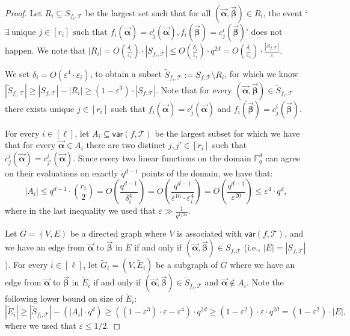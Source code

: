 \documentclass[10pt,a4paper]{article}
\newcommand{\F}{\mathbb{F}}
\renewcommand{\ge}{ \geqslant}
\renewcommand{\le}{ \leqslant}
\renewcommand{\epsilon}{\varepsilon}
\newcommand{\alphab}{\vec{\bm{\alpha}}}
\newcommand{\betab}{\vec{\bm{\beta}}}
\newcommand{\var}{\mathsf{var}}
\renewcommand{\tilde}{\widetilde}
\begin{document}
\begin{proof}
	Let $R_i\subseteq S_{f_i,\mathcal{T}}$ be the largest set such that for all $(\alphab, \betab)\in R_i$, the event `$\exists\ \text{unique } j\in[r_i] \text{ such that }f_i(\alphab)=c_j^i(\alphab),
	f_i(\betab)=c_j^i(\betab)$' does not happen. We note that $|R_i|=O\left(\frac{\delta_i}{\epsilon_i}\right)\cdot |S_{f_i,\mathcal{T}}|\le O\left(\frac{\delta_i}{\epsilon_i}\right)\cdot q^{2d}= O\left(\frac{\delta_i}{\epsilon_i}\right)\cdot \frac{|S_{f,\mathcal{T}}|}{\varepsilon}$. 
	
	We set $\delta_i=O(\varepsilon^{4}\cdot \varepsilon_i)$, to obtain a subset $\tilde{S}_{f_i,\mathcal{T}}:=  S_{f,\mathcal{T}}\setminus R_i$, for which we know $|\tilde{S}_{f_i,\mathcal{T}}|\ge |{S}_{f,\mathcal{T}}|-|R_i| \ge  (1-\varepsilon^{3})\cdot |{S}_{f,\mathcal{T}}|$. Note that  for every $(\alphab, \betab) \in \tilde{S}_{f_i,\mathcal{T}}$ there exists unique $j\in[r_i]$ such that  $f_i(\alphab)=c_j^i(\alphab)$ and $f_i(\betab)=c_j^i(\betab)$.
	
	
	For every $i\in [\ell]$, let $A_i\subseteq \var(f,\mathcal{T})$ be the largest subset for which we have that for every  $\alphab\in A_i$ there are two distinct $j,j'\in [r_i]$ such that $c_j^i(\alphab)=c_{j'}^i(\alphab)$. 
	Since every two linear functions on the domain $\F_q^d$ can agree on their evaluations on exactly $q^{d-1}$ points of the domain, we have that:
	$$
	|A_i|\le {q^{d-1}}\cdot \binom{r_i}{2}=O\left(\frac{q^{d-1}}{\delta_i^4}\right)= O\left(\frac{q^{d-1}}{\varepsilon^{16}\cdot \varepsilon_i^4}\right)= O\left(\frac{q^{d-1}}{\varepsilon^{20}}\right)\le \varepsilon^{4}\cdot q^d,
	$$
	where in the last inequality we used that $\varepsilon\gg\frac{1}{q^{1/24}}$. 
	
	
	
	
	
	Let $G = (V,E)$ be a directed graph where $V$ is associated with $\var(f,\mathcal{T})$, and we have an edge from $\alphab$ to $\betab$ in $E$ if and only if $(\alphab,\betab)\in S_{f,\mathcal{T}}$ (i.e., $|E|=|S_{f,\mathcal{T}}|$). For every $i\in [\ell]$, let $\tilde G_i = (V,\tilde E_i)$ be a subgraph of $G$ where we have an edge from $\alphab$ to $\betab$ in $\tilde E_i$ if and only if $(\alphab,\betab)\in \tilde{S}_{f_i,\mathcal{T}}$ and $\alphab\notin A_i$. Note the following lower bound on size of $\tilde E_i$: $$|\tilde E_i|\ge |\tilde S_{f_i,\mathcal{T}}|-\left(|A_i|\cdot q^d\right)\ge  \left((1-\varepsilon^{3})\cdot \varepsilon-\varepsilon^{4}\right)\cdot q^{2d}\ge (1-\varepsilon^2)\cdot \varepsilon\cdot q^{2d}=(1-\varepsilon^2)\cdot |E|,$$ where we used that $\varepsilon\le 1/2$.
	

\end{proof}
\end{document}
